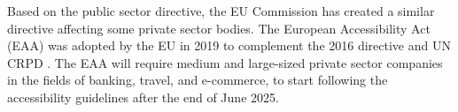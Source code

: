 Based on the public sector directive, the EU Commission has created a similar directive affecting some private sector bodies. The European Accessibility Act (EAA) was adopted by the EU in 2019 to complement the 2016 directive and UN CRPD \citep{eudirective2019}. The EAA will require medium and large-sized private sector companies in the fields of banking, travel, and e-commerce, to start following the accessibility guidelines after the end of June 2025.

